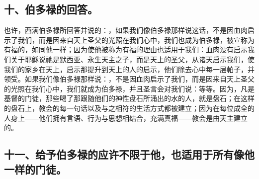 
\subsection{十、伯多禄的回答。}

也许，西满伯多禄所回答并说的：，如果我们像伯多禄那样说这话，不是因血肉启示了我们，而是因来自天上圣父的光照在我们心中，我们也成为伯多禄，被宣称为有福的，如同他一样；因为使他被称为有福的理由也适用于我们：血肉没有启示我们关于耶稣说祂是默西亚、永生天主之子，而是天上的圣父，从诸天启示我们，使我们的家乡在天上，启示那提升到天上的人的启示，他们除去心中每一层帕子，并领受。如果我们像伯多禄那样说：，不是因血肉启示了我们，而是因来自天上圣父的光照在我们心中，我们就成为伯多禄，并且圣言会对我们说：等等。因为，凡是基督的门徒，那些喝了那跟随他们的神性盘石所涌出的水的人，就是盘石；在这样的盘石上，教会的每一句话以及与之相符的生活方式都被建立；因为在每位成全的人身上——他们拥有言语、行为与思想相结合，充满真福——教会是由天主建立的。\par


\subsection{十一、给予伯多禄的应许不限于他，也适用于所有像他一样的门徒。}

